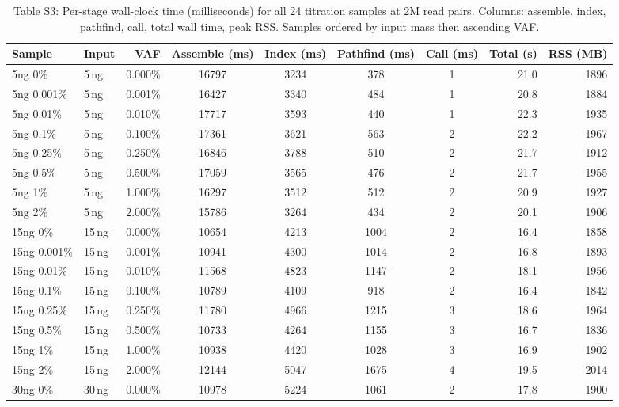 \begin{table}[h]
  \centering
  \caption{Table S3: Per-stage wall-clock time (milliseconds) for all 24
    titration samples at 2M read pairs. Columns: assemble, index, pathfind,
    call, total wall time, peak RSS. Samples ordered by input mass then
    ascending VAF.}
  \label{tab:s3-runtime}
  \small
  \begin{tabular}{llrccccrr}
    \toprule
    Sample & Input & VAF & Assemble (ms) & Index (ms) & Pathfind (ms) & Call (ms) & Total (s) & RSS (MB) \\
    \midrule
    5ng 0\%     & 5\,ng  & 0.000\% & 16797 & 3234 & 378  & 1 & 21.0 & 1896 \\
    5ng 0.001\% & 5\,ng  & 0.001\% & 16427 & 3340 & 484  & 1 & 20.8 & 1884 \\
    5ng 0.01\%  & 5\,ng  & 0.010\% & 17717 & 3593 & 440  & 1 & 22.3 & 1935 \\
    5ng 0.1\%   & 5\,ng  & 0.100\% & 17361 & 3621 & 563  & 2 & 22.2 & 1967 \\
    5ng 0.25\%  & 5\,ng  & 0.250\% & 16846 & 3788 & 510  & 2 & 21.7 & 1912 \\
    5ng 0.5\%   & 5\,ng  & 0.500\% & 17059 & 3565 & 476  & 2 & 21.7 & 1955 \\
    5ng 1\%     & 5\,ng  & 1.000\% & 16297 & 3512 & 512  & 2 & 20.9 & 1927 \\
    5ng 2\%     & 5\,ng  & 2.000\% & 15786 & 3264 & 434  & 2 & 20.1 & 1906 \\
    \midrule
    15ng 0\%    & 15\,ng & 0.000\% & 10654 & 4213 & 1004 & 2 & 16.4 & 1858 \\
    15ng 0.001\%& 15\,ng & 0.001\% & 10941 & 4300 & 1014 & 2 & 16.8 & 1893 \\
    15ng 0.01\% & 15\,ng & 0.010\% & 11568 & 4823 & 1147 & 2 & 18.1 & 1956 \\
    15ng 0.1\%  & 15\,ng & 0.100\% & 10789 & 4109 &  918 & 2 & 16.4 & 1842 \\
    15ng 0.25\% & 15\,ng & 0.250\% & 11780 & 4966 & 1215 & 3 & 18.6 & 1964 \\
    15ng 0.5\%  & 15\,ng & 0.500\% & 10733 & 4264 & 1155 & 3 & 16.7 & 1836 \\
    15ng 1\%    & 15\,ng & 1.000\% & 10938 & 4420 & 1028 & 3 & 16.9 & 1902 \\
    15ng 2\%    & 15\,ng & 2.000\% & 12144 & 5047 & 1675 & 4 & 19.5 & 2014 \\
    \midrule
    30ng 0\%    & 30\,ng & 0.000\% & 10978 & 5224 & 1061 & 2 & 17.8 & 1900 \\

\end{tabular}
\end{table}
